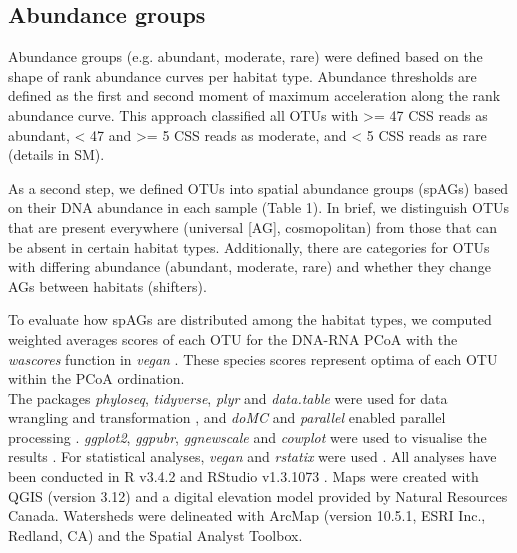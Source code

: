 \documentclass[12pt,a4paper]{article} %
\begin{document}
\subsection*{Abundance groups}
Abundance groups (e.g. abundant, moderate, rare) were defined based on the shape of rank abundance curves per habitat type.  Abundance thresholds are defined as the first and second moment of maximum acceleration along the rank abundance curve. This approach classified all OTUs with >= 47 CSS reads as abundant, < 47 and >= 5 CSS reads as moderate, and < 5 CSS reads as rare (details in SM).

As a second step, we defined OTUs into spatial abundance groups (spAGs) based on their DNA abundance in each sample (Table 1). In brief, we distinguish OTUs that are present everywhere (universal [AG], cosmopolitan) from those that can be absent in certain habitat types. Additionally, there are categories for OTUs with differing abundance (abundant, moderate, rare) and whether they change AGs between habitats (shifters).

To evaluate how spAGs are distributed among the habitat types, we computed weighted averages scores of each OTU for the DNA-RNA PCoA with the \textit{wascores} function in \textit{vegan} \citep{Oksanen2017}. These species scores represent optima of each OTU within the PCoA ordination.\\[.3cm]

The packages \textit{phyloseq}, \textit{tidyverse}, \textit{plyr} and \textit{data.table} were used for data wrangling and transformation \citep{McMurdie2013,Wickham2019, Wickham2011, Dowle2019}, and \textit{doMC} and \textit{parallel} enabled parallel processing \citep{Analytics2019, RCoreTeam2017}. \textit{ggplot2}, \textit{ggpubr}, \textit{ggnewscale} and \textit{cowplot} were used to visualise the results \citep{Wickham2016, Kassambara2018, Campitelli2020, Wilke2019}. For statistical analyses, \textit{vegan} and \textit{rstatix} were used \citep{Oksanen2017, Kassambara2020}. All analyses have been conducted in R v3.4.2 \citep{RCoreTeam2017} and RStudio v1.3.1073 \citep{RStudioTeam2016}. Maps were created with QGIS (version 3.12) and a digital elevation model provided by Natural Resources Canada. Watersheds were delineated with ArcMap (version 10.5.1, ESRI Inc., Redland, CA) and the Spatial Analyst Toolbox.
\end{document}
